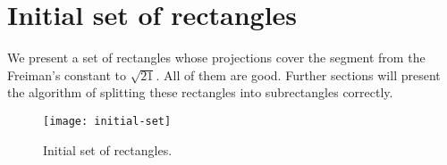 \section{Initial set of rectangles}

We present a set of rectangles
whose projections cover the segment from the Freiman's constant to $\sqrt{21}$.
All of them are good.
Further sections will present the algorithm of splitting these rectangles into subrectangles correctly.

\begin{figure}[H]
	\centering
	\texttt{[image: initial-set]}
	\caption{Initial set of rectangles.}
	\label{initial-set}
\end{figure}
